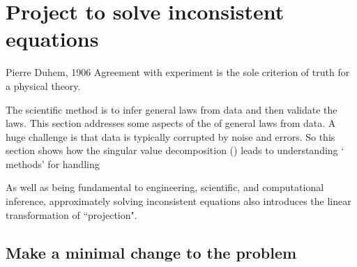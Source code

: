 

\section{Project to solve inconsistent equations}
\label{sec:asie}
\secttoc

\begin{quoted}{Pierre Duhem, 1906}
Agreement with experiment is the sole criterion of truth for a physical theory.
\end{quoted}

The scientific method is to infer general laws from data and then validate the laws.
This section addresses some aspects of the  of general laws from data.
A huge challenge is that data is typically corrupted by noise and errors.
So this section shows how the singular value decomposition (\svd) leads to understanding ` methods' for handling 

As well as being fundamental to engineering, scientific, and computational inference, approximately solving inconsistent equations also introduces the linear transformation of ``projection".



\subsection{Make a minimal change to the problem}
\label{sec:mmctp}

